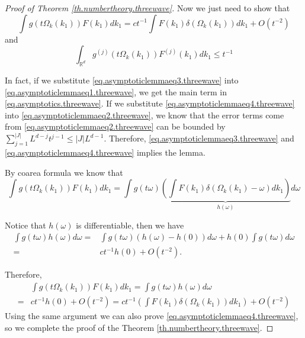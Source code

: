 \begin{proof}[Proof of Theorem \ref{th.numbertheory.threewave}]
Now we just need to show that 
\begin{equation}\label{eq.asymptoticlemmaeq3.threewave}
    \int g(t\Omega_k(k_1)) F(k_1) dk_1 =ct^{-1} \int F(k_1) \delta(\Omega_k(k_1)) dk_1+ O(t^{-2})
\end{equation}
and 
\begin{equation}\label{eq.asymptoticlemmaeq4.threewave}
    \int_{\mathbb{R}^d}  g^{(j)}(t\Omega_k(k_1))F^{(j)}(k_1) dk_1 \le t^{-1}
\end{equation}

In fact, if we substitute \eqref{eq.asymptoticlemmaeq3.threewave} into \eqref{eq.asymptoticlemmaeq1.threewave}, we get the main term in \eqref{eq.asymptotics.threewave}. If we substitute \eqref{eq.asymptoticlemmaeq4.threewave} into \eqref{eq.asymptoticlemmaeq2.threewave}, we know that the error terms come from \eqref{eq.asymptoticlemmaeq2.threewave} can be bounded by $\sum^{|J|}_{j=1}L^{d-j}t^{j-1}\le |J| L^{d-1}$. Therefore, \eqref{eq.asymptoticlemmaeq3.threewave} and \eqref{eq.asymptoticlemmaeq4.threewave} implies the lemma.

By coarea formula we know that
\begin{equation}
    \int g(t\Omega_k(k_1)) F(k_1) dk_1 =\int g(t\omega) \underbrace{\left(\int F(k_1) \delta(\Omega_k(k_1)-\omega)dk_1\right) }_{h(\omega)} d\omega 
\end{equation}

Notice that $h(\omega)$ is differentiable, then we have
\begin{equation}
\begin{split}
    \int g(t\omega)h(\omega) d\omega=&\int g(t\omega)(h(\omega)-h(0)) d\omega + h(0)\int g(t\omega)d\omega
    \\
    = &ct^{-1}h(0) +O(t^{-2}). 
\end{split}
\end{equation}

Therefore, 
\begin{equation}
\begin{split}
    &\int g(t\Omega_k(k_1)) F(k_1) dk_1 =\int g(t\omega)h(\omega)  d\omega 
    \\
    =&ct^{-1}h(0) +O(t^{-2})=ct^{-1}\left(\int F(k_1) \delta(\Omega_k(k_1))dk_1\right)  +O(t^{-2})
\end{split}
\end{equation}
Using the same argument we can also prove \eqref{eq.asymptoticlemmaeq4.threewave}, so we complete the proof of the Theorem \ref{th.numbertheory.threewave}.
\end{proof}

